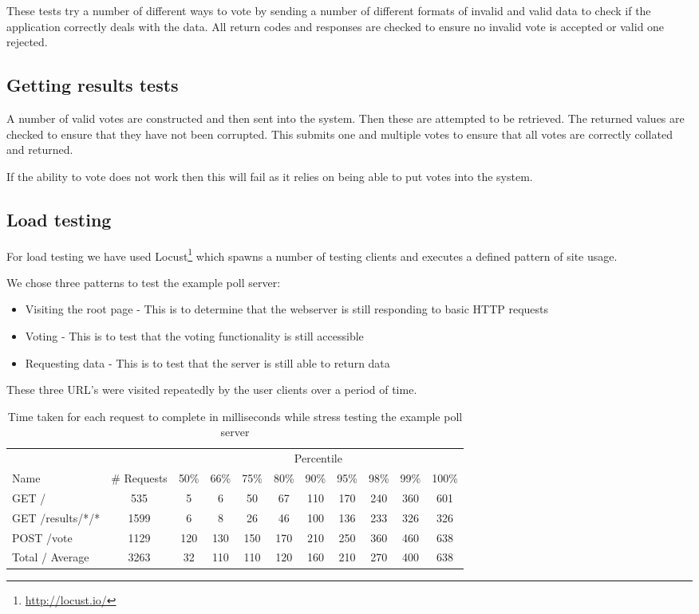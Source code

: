 These tests try a number of different ways to vote by sending a number of different formats of invalid and valid data to check if the application correctly deals with the data. All return codes and responses are checked to ensure no invalid vote is accepted or valid one rejected.

\subsection{Getting results tests}

A number of valid votes are constructed and then sent into the system. Then these are attempted to be retrieved. The returned values are checked to ensure that they have not been corrupted. This submits one and multiple votes to ensure that all votes are correctly collated and returned.

If the ability to vote does not work then this will fail as it relies on being able to put votes into the system.

\subsection{Load testing}

For load testing we have used Locust\footnote{\url{http://locust.io/}} which spawns a number of testing clients and executes a defined pattern of site usage.

We chose three patterns to test the example poll server:

\begin{itemize}
\item Visiting the root page - This is to determine that the webserver is still responding to basic HTTP requests
\item Voting - This is to test that the voting functionality is still accessible
\item Requesting data - This is to test that the server is still able to return data
\end{itemize}

These three URL's were visited repeatedly by the user clients over a period of time.

\begin{table}
\caption{Time taken for each request to complete in milliseconds while stress testing the example poll server}
\begin{tabular}{l c  c c c c c c c c c }
\hline 
& & \multicolumn{9}{c}{Percentile} \\
Name & \# Requests & 50\% & 66\% & 75\% & 80\% & 90\% & 95\% & 98\% & 99\% & 100\% \\ 
\hline 
GET / & 535 & 5 & 6 & 50 & 67 & 110 & 170 & 240 & 360 & 601 \\ 
\hline 
GET /results/*/* & 1599 & 6 & 8 & 26 & 46 & 100 & 136 & 233 & 326 & 326 \\ 
\hline 
POST /vote & 1129 & 120 & 130 & 150 & 170 & 210 & 250 & 360 & 460 & 638 \\ 
\hline 
Total / Average & 3263 & 32 & 110 & 110 & 120 & 160 & 210 & 270 & 400 & 638 \\ 
\hline 
\end{tabular}
\label{Table:stress_testing_poll_server}
\end{table}

